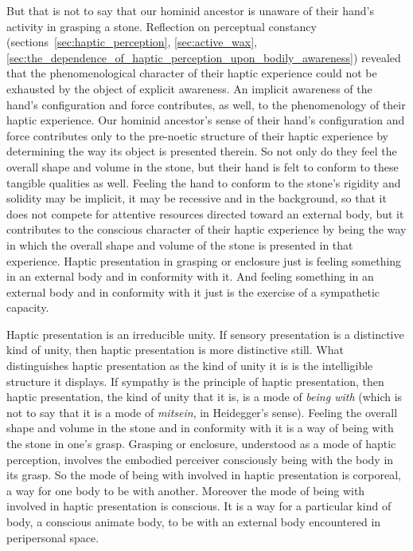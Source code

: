 But that is not to say that our hominid ancestor is unaware of their hand's activity in grasping a stone. Reflection on perceptual constancy (sections~\ref{sec:haptic_perception}, \ref{sec:active_wax}, \ref{sec:the_dependence_of_haptic_perception_upon_bodily_awareness}) revealed that the phenomenological character of their haptic experience could not be exhausted by the object of explicit awareness. An implicit awareness of the hand's configuration and force contributes, as well, to the phenomenology of their haptic experience. Our hominid ancestor's sense of their hand’s configuration and force contributes only to the pre-noetic structure of their haptic experience by determining the way its object is presented therein. So not only do they feel the overall shape and volume in the stone, but their hand is felt to conform to these tangible qualities as well. Feeling the hand to conform to the stone's rigidity and solidity may be implicit, it may be recessive and in the background, so that it does not compete for attentive resources directed toward an external body, but it contributes to the conscious character of their haptic experience by being the way in which the overall shape and volume of the stone is presented in that experience. Haptic presentation in grasping or enclosure just is feeling something in an external body and in conformity with it. And feeling something in an external body and in conformity with it just is the exercise of a sympathetic capacity.

Haptic presentation is an irreducible unity. If sensory presentation is a distinctive kind of unity, then haptic presentation is more distinctive still. What distinguishes haptic presentation as the kind of unity it is is the intelligible structure it displays. If sympathy is the principle of haptic presentation, then haptic presentation, the kind of unity that it is, is a mode of \emph{being with} (which is not to say that it is a mode of \emph{mitsein}, in Heidegger's sense). Feeling the overall shape and volume in the stone and in conformity with it is a way of being with the stone in one's grasp. Grasping or enclosure, understood as a mode of haptic perception, involves the embodied perceiver consciously being with the body in its grasp. So the mode of being with involved in haptic presentation is corporeal, a way for one body to be with another. Moreover the mode of being with involved in haptic presentation is conscious. It is a way for a particular kind of body, a conscious animate body, to be with an external body encountered in peripersonal space.

